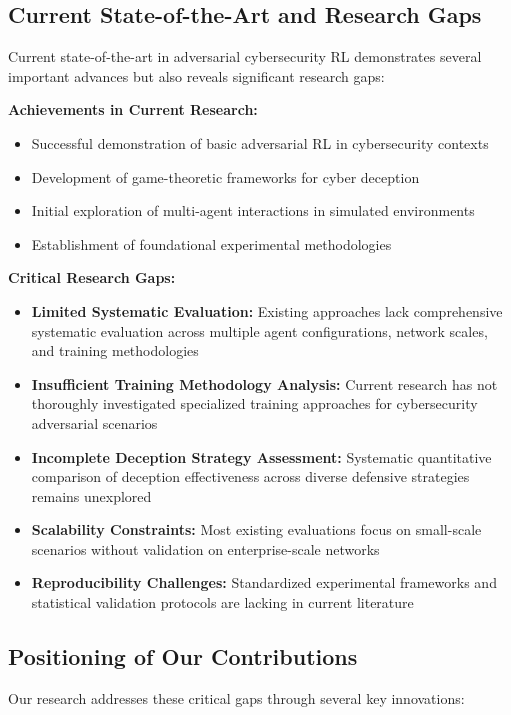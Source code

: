 \documentclass[12pt,oneside]{article}
\begin{document}
\subsection{Current State-of-the-Art and Research Gaps}

Current state-of-the-art in adversarial cybersecurity RL demonstrates several important advances but also reveals significant research gaps:

\textbf{Achievements in Current Research:}
\begin{itemize}
\item Successful demonstration of basic adversarial RL in cybersecurity contexts
\item Development of game-theoretic frameworks for cyber deception
\item Initial exploration of multi-agent interactions in simulated environments
\item Establishment of foundational experimental methodologies
\end{itemize}

\textbf{Critical Research Gaps:}
\begin{itemize}
\item \textbf{Limited Systematic Evaluation:} Existing approaches lack comprehensive systematic evaluation across multiple agent configurations, network scales, and training methodologies
\item \textbf{Insufficient Training Methodology Analysis:} Current research has not thoroughly investigated specialized training approaches for cybersecurity adversarial scenarios
\item \textbf{Incomplete Deception Strategy Assessment:} Systematic quantitative comparison of deception effectiveness across diverse defensive strategies remains unexplored
\item \textbf{Scalability Constraints:} Most existing evaluations focus on small-scale scenarios without validation on enterprise-scale networks
\item \textbf{Reproducibility Challenges:} Standardized experimental frameworks and statistical validation protocols are lacking in current literature
\end{itemize}

\subsection{Positioning of Our Contributions}

Our research addresses these critical gaps through several key innovations:
\end{document}
